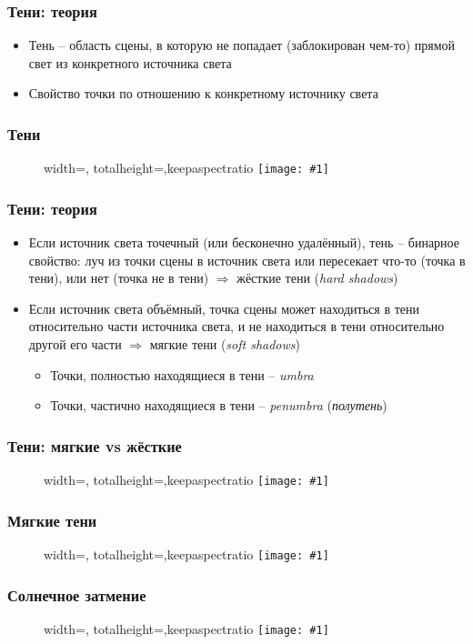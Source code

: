 \documentclass[10pt]{beamer}
\newcommand{\slideimage}[1]{
  \begin{figure}
    \begin{adjustbox}{width=\textwidth, totalheight=\textheight-2\baselineskip-2\baselineskip,keepaspectratio}
      \texttt{[image: \#1]}
    \end{adjustbox}
  \end{figure}
}
\begin{document}
\begin{frame}[fragile]
\frametitle{Тени: теория}
\begin{itemize}
\item Тень -- область сцены, в которую не попадает (заблокирован чем-то) прямой свет из конкретного источника света
\item Свойство точки по отношению к конкретному источнику света
\end{itemize}
\end{frame}

\begin{frame}[fragile]
\frametitle{Тени}
\slideimage{shadows1.png}
\end{frame}

\begin{frame}[fragile]
\frametitle{Тени: теория}
\begin{itemize}
\item Если источник света точечный (или бесконечно удалённый), тень -- бинарное свойство: луч из точки сцены в источник света или пересекает что-то (точка в тени), или нет (точка не в тени) \begin{math}\Longrightarrow\end{math} жёсткие тени (\textit{hard shadows})
\pause
\item Если источник света объёмный, точка сцены может находиться в тени относительно части источника света, и не находиться в тени относительно другой его части \begin{math}\Longrightarrow\end{math} мягкие тени (\textit{soft shadows})
\pause
\begin{itemize}
\item Точки, полностью находящиеся в тени -- \textit{umbra}
\item Точки, частично находящиеся в тени -- \textit{penumbra} (\textit{полутень})
\end{itemize}
\end{itemize}
\end{frame}

\begin{frame}[fragile]
\frametitle{Тени: мягкие vs жёсткие}
\slideimage{shadow-scheme1.png}
\end{frame}

\begin{frame}[fragile]
\frametitle{Мягкие тени}
\slideimage{shadows2.png}
\end{frame}

\begin{frame}[fragile]
\frametitle{Солнечное затмение}
\slideimage{eclipse.png}
\end{frame}
\end{document}
